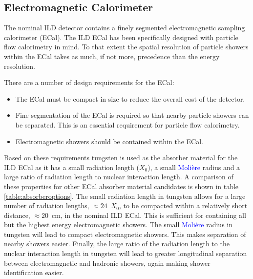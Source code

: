
\subsection{Electromagnetic Calorimeter}
\label{sec:ildecal}
The nominal ILD detector contains a finely segmented electromagnetic sampling calorimeter (ECal).  The ILD ECal has been specifically designed with particle flow calorimetry in mind.  To that extent the spatial resolution of particle showers within the ECal takes as much, if not more, precedence than the energy resolution.   

There are a number of design requirements for the ECal:
\begin{itemize}
\item The ECal must be compact in size to reduce the overall cost of the detector.
\item Fine segmentation of the ECal is required so that nearby particle showers can be separated.  This is an essential requirement for particle flow calorimetry.
\item Electromagnetic showers should be contained within the ECal.
\end{itemize}
Based on these requirements tungsten is used as the absorber material for the ILD ECal as it has a small radiation length ($X_{0}$), a small \textcolor{blue}{Moli\`{e}re} radius and a large ratio of radiation length to nuclear interaction length.  A comparison of these properties for other ECal absorber material candidates is shown in table \ref{table:absorberoptions}.  The small radiation length in tungsten allows for a large number of radiation lengths, $\approx 24$~$X_{0}$, to be compacted within a relatively short distance, $\approx 20$~cm, in the nominal ILD ECal.  This is sufficient for containing all but the highest energy electromagnetic showers.  The small \textcolor{blue}{Moli\`{e}re} radius in tungsten will lead to compact electromagnetic showers.  This makes separation of nearby showers easier.  Finally, the large ratio of the radiation length to the nuclear interaction length in tungsten will lead to greater longitudinal separation between electromagnetic and hadronic showers, again making shower identification easier.   

